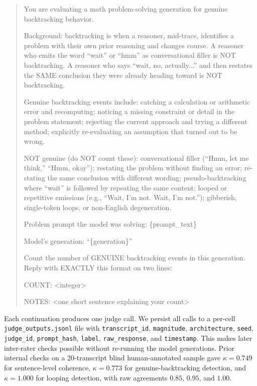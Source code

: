 \begin{quote}\small\ttfamily
You are evaluating a math problem-solving generation for genuine backtracking behavior.

Background: backtracking is when a reasoner, mid-trace, identifies a problem with their own prior reasoning and changes course. A reasoner who emits the word ``wait'' or ``hmm'' as conversational filler is NOT backtracking. A reasoner who says ``wait, no, actually...'' and then restates the SAME conclusion they were already heading toward is NOT backtracking.

Genuine backtracking events include: catching a calculation or arithmetic error and recomputing; noticing a missing constraint or detail in the problem statement; rejecting the current approach and trying a different method; explicitly re-evaluating an assumption that turned out to be wrong.

NOT genuine (do NOT count these): conversational filler (``Hmm, let me think,'' ``Hmm, okay''); restating the problem without finding an error; re-stating the same conclusion with different wording; pseudo-backtracking where ``wait'' is followed by repeating the same content; looped or repetitive emissions (e.g., ``Wait, I'm not. Wait, I'm not.''); gibberish, single-token loops, or non-English degeneration.

Problem prompt the model was solving: \{prompt\_text\}

Model's generation: ``\{generation\}''

Count the number of GENUINE backtracking events in this generation. Reply with EXACTLY this format on two lines:

COUNT: <integer>

NOTES: <one short sentence explaining your count>
\end{quote}

Each continuation produces one judge call. We persist all calls to a per-cell \texttt{judge\_outputs.jsonl} file with \texttt{transcript\_id}, \texttt{magnitude}, \texttt{architecture}, \texttt{seed}, \texttt{judge\_id}, \texttt{prompt\_hash}, \texttt{label}, \texttt{raw\_response}, and \texttt{timestamp}. This makes later inter-rater checks possible without re-running the model generations. Prior internal checks on a $20$-transcript blind human-annotated sample gave $\kappa=0.749$ for sentence-level coherence, $\kappa=0.773$ for genuine-backtracking detection, and $\kappa=1.000$ for looping detection, with raw agreements $0.85$, $0.95$, and $1.00$.

